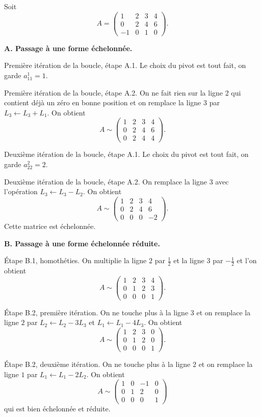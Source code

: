\documentclass[class=report,crop=false]{standalone}
\begin{document}
\begin{exemple}
Soit
$$A=\begin{pmatrix}1&2&3&4\\
0&2&4&6\\
-1&0&1&0
\end{pmatrix}.$$

\textbf{A. Passage à une forme échelonnée.}

Première itération de la boucle, étape A.1. Le choix du pivot est tout fait,
on garde $a_{11}^1=1$.

Première itération de la boucle, étape A.2. On ne fait rien sur la ligne $2$ qui contient
déjà un zéro en bonne position et on remplace la ligne 3 par $L_3 \leftarrow L_3 + L_1$.
On obtient
$$A\sim\begin{pmatrix}1&2&3&4\\
0&2&4&6\\
0&2&4&4
\end{pmatrix}.$$

Deuxième itération de la boucle, étape A.1. Le choix du pivot est tout fait,
on garde $a^2_{22}=2$.

Deuxième itération de la boucle, étape A.2. On remplace  la ligne $3$ avec
l'opération $L_3 \leftarrow L_3 - L_2$. On obtient
$$A\sim\begin{pmatrix}1&2&3&4\\
0&2&4&6\\
0&0&0&-2
\end{pmatrix}.$$
Cette matrice est échelonnée.

\medskip

\textbf{B. Passage à une forme échelonnée réduite.}

\'Etape B.1, homothéties. On multiplie la ligne $2$ par $\frac12$
et la ligne $3$ par $-\frac12$ et l'on obtient
$$A\sim\begin{pmatrix}1&2&3&4\\
0&1&2&3\\
0&0&0&1
\end{pmatrix}.$$

{\'E}tape B.2, première itération.
On ne touche plus à la ligne $3$ et on remplace la ligne $2$ par
$L_2 \leftarrow L_2-3L_3$ et $L_1 \leftarrow L_1 - 4L_3$.
On obtient
$$A\sim\begin{pmatrix}1&2&3&0\\
0&1&2&0\\
0&0&0&1
\end{pmatrix}.$$

{\'E}tape B.2, deuxième itération. On ne touche plus à la ligne $2$
et on remplace la ligne $1$ par $L_1 \leftarrow L_1-2L_2$. On obtient
$$A\sim\begin{pmatrix}1&0&-1&0\\
0&1&2&0\\
0&0&0&1
\end{pmatrix}$$
qui est bien échelonnée et réduite.
\end{exemple}
\end{document}
